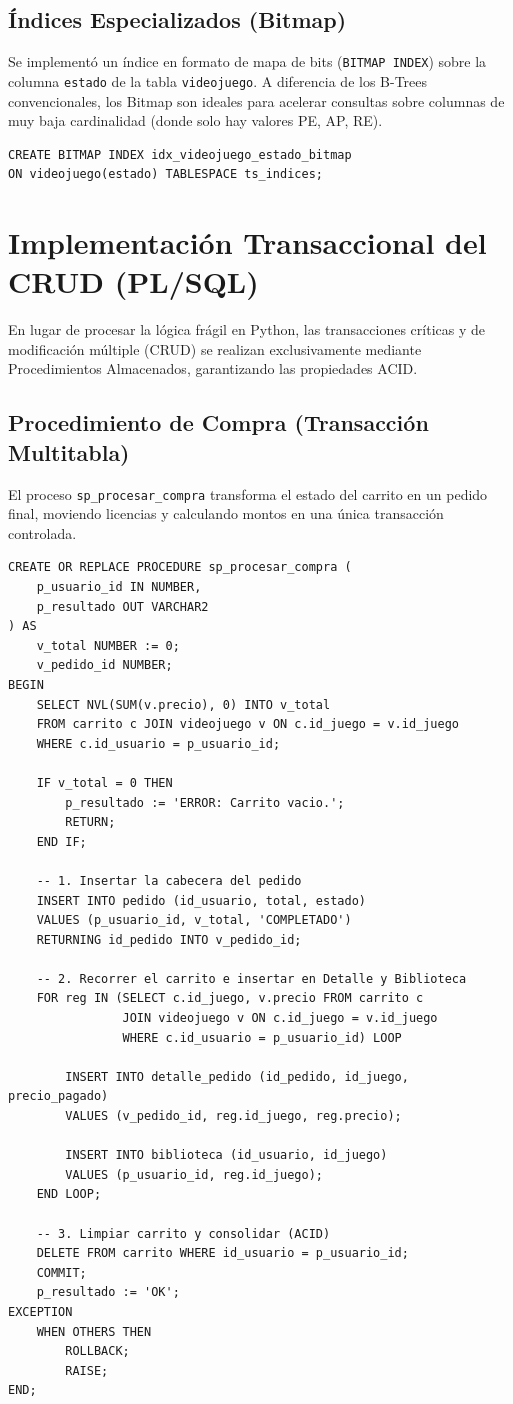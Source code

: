 \documentclass[12pt,a4paper]{article}
\begin{document}
\subsection{Índices Especializados (Bitmap)}
Se implementó un índice en formato de mapa de bits (\texttt{BITMAP INDEX}) sobre la columna \texttt{estado} de la tabla \texttt{videojuego}. A diferencia de los B-Trees convencionales, los Bitmap son ideales para acelerar consultas sobre columnas de muy baja cardinalidad (donde solo hay valores PE, AP, RE).
\begin{lstlisting}
CREATE BITMAP INDEX idx_videojuego_estado_bitmap 
ON videojuego(estado) TABLESPACE ts_indices;
\end{lstlisting}

\section{Implementación Transaccional del CRUD (PL/SQL)}
En lugar de procesar la lógica frágil en Python, las transacciones críticas y de modificación múltiple (CRUD) se realizan exclusivamente mediante Procedimientos Almacenados, garantizando las propiedades ACID.

\subsection{Procedimiento de Compra (Transacción Multitabla)}
El proceso \texttt{sp\_procesar\_compra} transforma el estado del carrito en un pedido final, moviendo licencias y calculando montos en una única transacción controlada.

\begin{lstlisting}
CREATE OR REPLACE PROCEDURE sp_procesar_compra (
    p_usuario_id IN NUMBER,
    p_resultado OUT VARCHAR2
) AS
    v_total NUMBER := 0;
    v_pedido_id NUMBER;
BEGIN
    SELECT NVL(SUM(v.precio), 0) INTO v_total
    FROM carrito c JOIN videojuego v ON c.id_juego = v.id_juego
    WHERE c.id_usuario = p_usuario_id;
    
    IF v_total = 0 THEN
        p_resultado := 'ERROR: Carrito vacio.';
        RETURN;
    END IF;

    -- 1. Insertar la cabecera del pedido
    INSERT INTO pedido (id_usuario, total, estado)
    VALUES (p_usuario_id, v_total, 'COMPLETADO')
    RETURNING id_pedido INTO v_pedido_id;

    -- 2. Recorrer el carrito e insertar en Detalle y Biblioteca
    FOR reg IN (SELECT c.id_juego, v.precio FROM carrito c 
                JOIN videojuego v ON c.id_juego = v.id_juego 
                WHERE c.id_usuario = p_usuario_id) LOOP
                
        INSERT INTO detalle_pedido (id_pedido, id_juego, precio_pagado)
        VALUES (v_pedido_id, reg.id_juego, reg.precio);
        
        INSERT INTO biblioteca (id_usuario, id_juego)
        VALUES (p_usuario_id, reg.id_juego);
    END LOOP;

    -- 3. Limpiar carrito y consolidar (ACID)
    DELETE FROM carrito WHERE id_usuario = p_usuario_id;
    COMMIT;
    p_resultado := 'OK';
EXCEPTION
    WHEN OTHERS THEN
        ROLLBACK;
        RAISE;
END;
\end{lstlisting}
\end{document}
